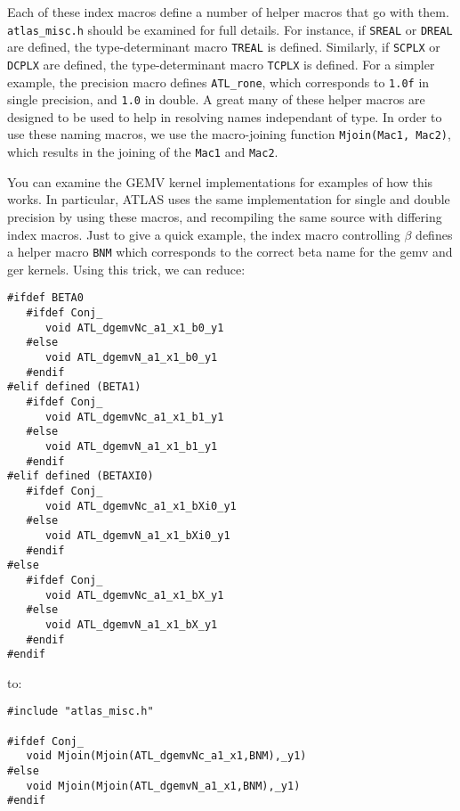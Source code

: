 \documentclass[11pt]{article}
\begin{document}
Each of these index macros define a number of helper macros that go with
them.  {\tt atlas\_misc.h} should be examined for full details.  
For instance, if {\tt SREAL} or {\tt DREAL} are defined, the
type-determinant macro {\tt TREAL} is defined.  Similarly,
if {\tt SCPLX} or {\tt DCPLX} are defined, the
type-determinant macro {\tt TCPLX} is defined.
For a simpler example, the precision macro defines \verb+ATL_rone+, which
corresponds to {\tt 1.0f} in single precision, and {\tt 1.0} in double.
A great many of these helper macros are designed to be used to help
in resolving names independant of type.  In order to use these naming
macros, we use the macro-joining function {\tt Mjoin(Mac1, Mac2)},
which results in the joining of the {\tt Mac1} and {\tt Mac2}.

You can examine the GEMV kernel implementations for examples of how
this works.  In particular, ATLAS uses the same implementation for
single and double precision by using these macros, and recompiling
the same source with differing index macros.  Just to give a quick example,
the index macro controlling $\beta$ defines a helper macro {\tt BNM} which
corresponds to the correct beta name for the gemv and ger kernels.  Using
this trick, we can reduce:
\begin{verbatim}
#ifdef BETA0
   #ifdef Conj_
      void ATL_dgemvNc_a1_x1_b0_y1
   #else
      void ATL_dgemvN_a1_x1_b0_y1
   #endif
#elif defined (BETA1)
   #ifdef Conj_
      void ATL_dgemvNc_a1_x1_b1_y1
   #else
      void ATL_dgemvN_a1_x1_b1_y1
   #endif
#elif defined (BETAXI0)
   #ifdef Conj_
      void ATL_dgemvNc_a1_x1_bXi0_y1
   #else
      void ATL_dgemvN_a1_x1_bXi0_y1
   #endif
#else
   #ifdef Conj_
      void ATL_dgemvNc_a1_x1_bX_y1
   #else
      void ATL_dgemvN_a1_x1_bX_y1
   #endif
#endif
\end{verbatim}
{\samepage
to:
\begin{verbatim}
#include "atlas_misc.h"

#ifdef Conj_
   void Mjoin(Mjoin(ATL_dgemvNc_a1_x1,BNM),_y1)
#else
   void Mjoin(Mjoin(ATL_dgemvN_a1_x1,BNM),_y1)
#endif
\end{verbatim}
}
\end{document}
